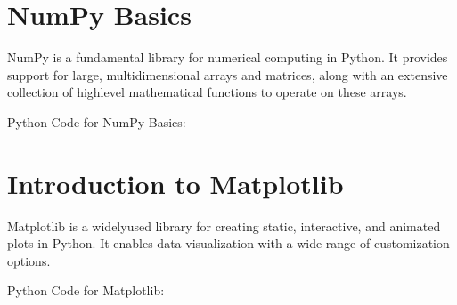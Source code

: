 \documentclass[letterpaper,10pt,english]{sphinxmanual}
\begin{document}
\section{NumPy Basics}
\label{\detokenize{basics/basics:numpy-basics}}
\sphinxAtStartPar
NumPy is a fundamental library for numerical computing in Python. It provides support for large, multi\sphinxhyphen{}dimensional arrays and matrices, along with an extensive collection of high\sphinxhyphen{}level mathematical functions to operate on these arrays.

\sphinxAtStartPar
Python Code for NumPy Basics:

\begin{sphinxVerbatim}[commandchars=\\\{\}]
   

  \PYG{p}{[}    \PYG{p}{]}
    
   
   

    
   
\end{sphinxVerbatim}


\section{Introduction to Matplotlib}
\label{\detokenize{basics/basics:introduction-to-matplotlib}}
\sphinxAtStartPar
Matplotlib is a widely\sphinxhyphen{}used library for creating static, interactive, and animated plots in Python. It enables data visualization with a wide range of customization options.

\sphinxAtStartPar
Python Code for Matplotlib:
\end{document}
